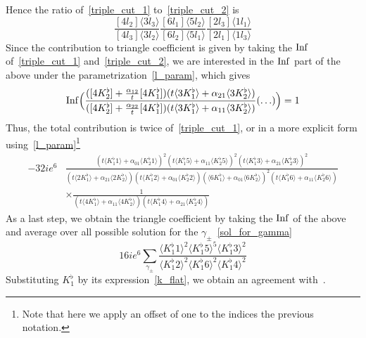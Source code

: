 Hence the ratio of~\cref{triple_cut_1} to~\cref{triple_cut_2} is
\begin{equation*}
\frac{[4l_2]\langle 3l_3\rangle}{[4l_3]\langle 3l_2\rangle}
\frac{[6l_1]\langle 5l_2\rangle}{[6l_2]\langle 5l_1\rangle}
\frac{[2l_3]\langle 1l_1\rangle}{[2l_1]\langle 1l_3\rangle}
\end{equation*}
Since the contribution to triangle coefficient is given by taking the $\mathrm{Inf}$ of~\cref{triple_cut_1} and~\cref{triple_cut_2}, we are interested in the $\mathrm{Inf}$ part of the above under the parametrization~\cref{l_param}, which gives
\begin{equation*}
\mathrm{Inf}\Big(\frac{([4K_2^\flat] + \frac{\alpha_{12}}{t}[4K_1^\flat])(t\langle 3K_1^\flat \rangle + \alpha_{21}\langle 3K_2^\flat\rangle)}{([4K_2^\flat] + \frac{\alpha_{22}}{t}[4K_1^\flat])(t\langle 3K_1^\flat \rangle + \alpha_{11}\langle 3K_2^\flat\rangle)}(\ldots)\Big)
= 1
\end{equation*} 
%
Thus, the total contribution is twice of~\ref{triple_cut_1}, or in a more explicit form using~\cref{l_param}\footnote{
Note that here we apply an offset of one to the indices \wrt the previous notation.
}
\begin{equation*}
\begin{split}
-32ie^6 & \frac{(t\langle K_1^\flat 1 \rangle + \alpha_{01}\langle K_2^\flat 1\rangle)^2
(t\langle K_1^\flat 5 \rangle + \alpha_{11}\langle K_2^\flat 5\rangle)^2
(t\langle K_1^\flat 3 \rangle + \alpha_{21}\langle K_2^\flat 3\rangle)^2
}{
(t\langle 2K_1^\flat  \rangle + \alpha_{21}\langle 2 K_2^\flat \rangle)
(t\langle K_1^\flat 2 \rangle + \alpha_{01}\langle K_2^\flat 2\rangle)
(\langle  6K_1^\flat  \rangle + \alpha_{01}\langle  6K_2^\flat \rangle)^2
(t\langle K_1^\flat 6 \rangle + \alpha_{11}\langle K_2^\flat 6\rangle)}
\\
&\times
\frac{1}{
(t\langle 4K_1^\flat  \rangle + \alpha_{11}\langle 4 K_2^\flat \rangle)
(t\langle K_1^\flat 4 \rangle + \alpha_{21}\langle K_2^\flat 4 \rangle)
}
\end{split}
\end{equation*}
As a last step, we obtain the triangle coefficient by taking the $\mathrm{Inf}$ of the above and average over all possible solution for the $\gamma_\pm$~\cref{sol_for_gamma}
\begin{equation*}
16ie^6\sum_{\gamma_\pm}\frac{\langle K_1^\flat 1 \rangle^2\langle K_1^\flat 5\rangle^5 \langle K_1^\flat 3 \rangle^2}{\langle K_1^\flat 2 \rangle^2\langle K_1^\flat 6\rangle^2 \langle K_1^\flat 4 \rangle^2}
\end{equation*}
Substituting $K_1^\flat$ by its expression~\cref{k_flat}, we obtain an agreement with~\cite{Forde:2007mi}.










